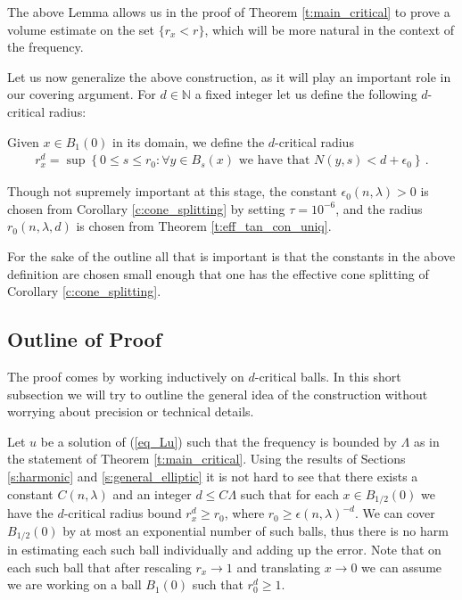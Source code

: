 \documentclass[11pt]{article}
\begin{document}
The above Lemma allows us in the proof of Theorem \ref{t:main_critical} to prove a volume estimate on the set $\{r_x<r\}$, which will be more natural in the context of the frequency.

Let us now generalize the above construction, as it will play an important role in our covering argument.  For $d\in{\mathds{N}}$ a fixed integer let us define the following $d$-critical radius:

\begin{definition}
 Given $x\in B_1(0)$ in its domain, we define the $d$-critical radius
 \begin{gather}
  r^d_x = \sup{\left\{{0\leq s\leq r_0: \forall y\in B_s(x) \text{ we have that } N(y,s)< d+\epsilon_0}\right\}} \, .
 \end{gather}
\end{definition}
\begin{remark}
Though not supremely important at this stage, the constant $\epsilon_0(n,\lambda)>0$ is chosen from Corollary \ref{c:cone_splitting} by setting $\tau=10^{-6}$, and the radius $r_0(n,\lambda, d)$ is chosen from Theorem \ref{t:eff_tan_con_uniq}. 
\end{remark}

For the sake of the outline all that is important is that the constants in the above definition are chosen small enough that one has the effective cone splitting of Corollary \ref{c:cone_splitting}.  

\subsection{Outline of Proof}\label{ss:proof_outline}

The proof comes by working inductively on $d$-critical balls.  In this short subsection we will try to outline the general idea of the construction without worrying about precision or technical details.  

Let $u$ be a solution of (\ref{eq_Lu}) such that the frequency is bounded by $\Lambda$ as in the statement of Theorem \ref{t:main_critical}.  Using the results of Sections \ref{s:harmonic} and \ref{s:general_elliptic} it is not hard to see that there exists a constant $C(n,\lambda)$ and an integer $d\leq C\Lambda$ such that for each $x\in B_{1/2}(0)$ we have the $d$-critical radius bound $r^d_x\geq r_0$, where $r_0\geq \epsilon(n,\lambda)^{-d}$.  We can cover $B_{1/2}(0)$ by at most an exponential number of such balls, thus there is no harm in estimating each such ball individually and adding up the error.  Note that on each such ball that after rescaling $r_x\to 1$ and translating $x\to 0$ we can assume we are working on a ball $B_1(0)$ such that $r^d_0\geq 1$.  
\end{document}
